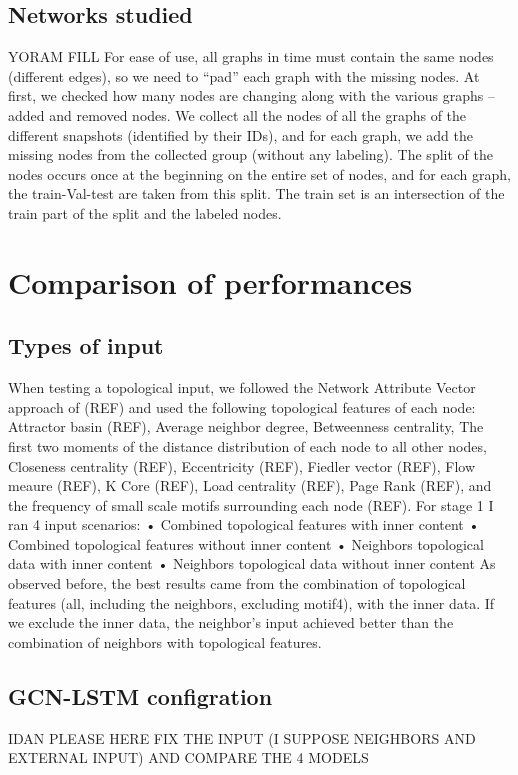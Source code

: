 \subsection{Networks studied}
YORAM FILL
For ease of use, all graphs in time must contain the same nodes (different edges), so we need to “pad” each graph with the missing nodes. At first, we checked how many nodes are changing along with the various graphs – added and removed nodes.
We collect all the nodes of all the graphs of the different snapshots (identified by their IDs), and for each graph, we add the missing nodes from the collected group (without any labeling).
The split of the nodes occurs once at the beginning on the entire set of nodes, and for each graph, the train-Val-test are taken from this split. The train set is an intersection of the train part of the split and the labeled nodes.

\section{Comparison of performances}
\subsection{Types of input}
When testing a topological input, we followed the Network Attribute Vector approach of (REF) and used the following topological features of each node: Attractor basin (REF),  Average neighbor degree, Betweenness centrality,  The first two moments of the distance distribution of each node to all other nodes,  Closeness centrality (REF), Eccentricity (REF), Fiedler vector (REF),  Flow meaure (REF),  K Core (REF), Load centrality (REF), Page Rank (REF), and the frequency of small scale motifs surrounding each node (REF).
For stage 1 I ran 4 input scenarios:
•	Combined topological features with inner content
•	Combined topological features without inner content
•	Neighbors topological data with inner content
•	Neighbors topological data without inner content
As observed before, the best results came from the combination of topological features (all, including the neighbors, excluding motif4), with the inner data.
If we exclude the inner data, the neighbor's input achieved better than the combination of neighbors with topological features.

\subsection{GCN-LSTM configration}
IDAN PLEASE HERE FIX THE INPUT (I SUPPOSE NEIGHBORS AND EXTERNAL INPUT) AND COMPARE THE 4 MODELS
